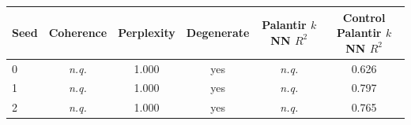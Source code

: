 \begin{tabular}{lccccc}
\toprule
Seed & Coherence & Perplexity & Degenerate & Palantir $k$NN $R^2$ & Control Palantir $k$NN $R^2$ \\
\midrule
0 & \textit{n.q.} & 1.000 & yes & \textit{n.q.} & 0.626 \\
1 & \textit{n.q.} & 1.000 & yes & \textit{n.q.} & 0.797 \\
2 & \textit{n.q.} & 1.000 & yes & \textit{n.q.} & 0.765 \\
\bottomrule
\end{tabular}
